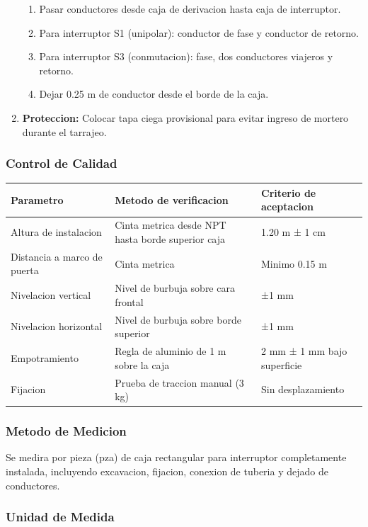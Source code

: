 \begin{enumerate}
\begin{enumerate}
    \item Pasar conductores desde caja de derivacion hasta caja de interruptor.
    \item Para interruptor S1 (unipolar): conductor de fase y conductor de retorno.
    \item Para interruptor S3 (conmutacion): fase, dos conductores viajeros y retorno.
    \item Dejar 0.25 m de conductor desde el borde de la caja.
  \end{enumerate}
  \item \textbf{Proteccion:} Colocar tapa ciega provisional para evitar ingreso de mortero durante el tarrajeo.
\end{enumerate}

\subsubsection{Control de Calidad}

\begin{longtable}{L{4.5cm} L{4.5cm} L{4.5cm}}
\toprule
\textbf{Parametro} & \textbf{Metodo de verificacion} & \textbf{Criterio de aceptacion} \\
\midrule
Altura de instalacion & Cinta metrica desde NPT hasta borde superior caja & 1.20 m ± 1 cm \\
Distancia a marco de puerta & Cinta metrica & Minimo 0.15 m \\
Nivelacion vertical & Nivel de burbuja sobre cara frontal & ±1 mm \\
Nivelacion horizontal & Nivel de burbuja sobre borde superior & ±1 mm \\
Empotramiento & Regla de aluminio de 1 m sobre la caja & 2 mm ± 1 mm bajo superficie \\
Fijacion & Prueba de traccion manual (3 kg) & Sin desplazamiento \\
\bottomrule
\end{longtable}

\subsubsection{Metodo de Medicion}

Se medira por pieza (pza) de caja rectangular para interruptor completamente instalada, incluyendo excavacion, fijacion, conexion de tuberia y dejado de conductores.

\subsubsection{Unidad de Medida}

